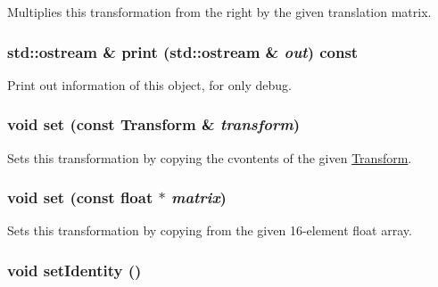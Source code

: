 Multiplies this transformation from the right by the given translation matrix. \hypertarget{classm3g_1_1Transform_6fea17fa1532df3794f8cb39cb4f911f}{
\subsubsection[{print}]{\setlength{\rightskip}{0pt plus 5cm}std::ostream \& print (std::ostream \& {\em out}) const}}
\label{classm3g_1_1Transform_6fea17fa1532df3794f8cb39cb4f911f}


Print out information of this object, for only debug. \hypertarget{classm3g_1_1Transform_8926ff19517a76de8f938025e9d3163d}{
\subsubsection[{set}]{\setlength{\rightskip}{0pt plus 5cm}void set (const {\bf Transform} \& {\em transform})}}
\label{classm3g_1_1Transform_8926ff19517a76de8f938025e9d3163d}


Sets this transformation by copying the cvontents of the given \hyperlink{classm3g_1_1Transform}{Transform}. \hypertarget{classm3g_1_1Transform_d1a2203142a848286c80d66c8c7fa37d}{
\subsubsection[{set}]{\setlength{\rightskip}{0pt plus 5cm}void set (const float $\ast$ {\em matrix})}}
\label{classm3g_1_1Transform_d1a2203142a848286c80d66c8c7fa37d}


Sets this transformation by copying from the given 16-element float array. \hypertarget{classm3g_1_1Transform_382e6ad7e6721b121e510959e1011be3}{
\subsubsection[{setIdentity}]{\setlength{\rightskip}{0pt plus 5cm}void setIdentity ()}}
\label{classm3g_1_1Transform_382e6ad7e6721b121e510959e1011be3}


